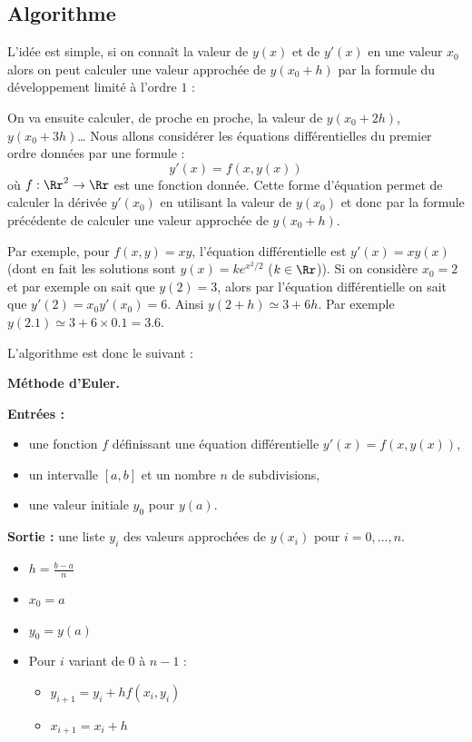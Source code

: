 \documentclass[11pt,class=report,crop=false]{standalone}
\begin{document}
\subsection{Algorithme}


L'idée est simple, si on connaît la valeur de $y(x)$ et de $y'(x)$ en une valeur $x_0$ alors 
on peut calculer une valeur approchée de $y(x_0 + h)$ par la formule du développement limité à l'ordre $1$ :

On va ensuite calculer, de proche en proche, la valeur de $y(x_0+2h)$, $y(x_0+3h)$\dots{}
Nous allons considérer les équations différentielles du premier ordre données par une formule :
$$y'(x) = f(x,y(x))$$
où $f : \Rr^2 \to \Rr$ est une fonction donnée.
Cette forme d'équation permet de calculer la dérivée $y'(x_0)$ en utilisant la valeur de $y(x_0)$ et donc par la formule précédente de calculer une valeur approchée de $y(x_0+h)$.

Par exemple, pour $f(x,y) = xy$, l'équation différentielle est $y'(x) = x y(x)$ (dont en fait les solutions sont $y(x) = k e^{x^2/2}$ ($k \in \Rr$)).
Si on considère $x_0 = 2$ et par exemple on sait que $y(2) = 3$, alors par l'équation différentielle on sait que $y'(2) = x_0 y'(x_0) = 6$.
Ainsi $y(2+h) \simeq 3 + 6h$. Par exemple $y(2.1) \simeq 3 + 6 \times 0.1 = 3.6$.

\bigskip

L'algorithme est donc le suivant :\\


\begin{algorithme}
\textbf{Méthode d'Euler.}

\textbf{Entrées :} 
    \begin{itemize}
        \item une fonction $f$ définissant une équation différentielle $y'(x) = f(x, y(x))$,
        \item un intervalle $[a,b]$ et un nombre $n$ de subdivisions,
        \item une valeur initiale $y_0$ pour $y(a)$.
    \end{itemize}

\textbf{Sortie :} une liste $y_i$ des valeurs approchées de $y(x_i)$ pour $i=0,\ldots,n$.

\begin{itemize}
    \item $h = \frac{b-a}{n}$
    \item $x_0 = a$
    \item $y_0 = y(a)$
    \item Pour $i$ variant de $0$ à $n-1$ :
    \begin{itemize}
        \item $y_{i+1} = y_i + h  f(x_i, y_i)$
        \item $x_{i+1} = x_i + h$
    \end{itemize}
\end{itemize}
\end{algorithme}
\end{document}

